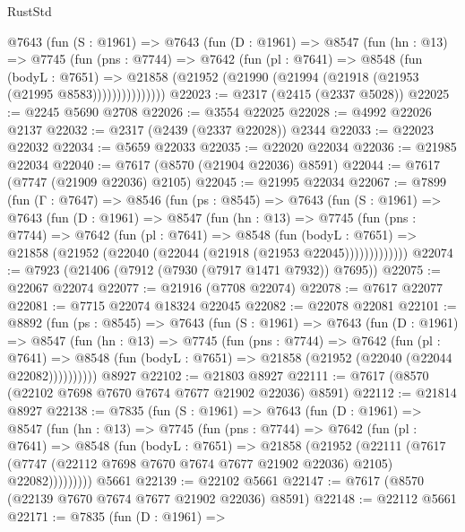 \begin{lexlean}{RustStd}
\begin{coremodule}
        @7643
          (fun (S : @1961) =>
          @7643
            (fun (D : @1961) =>
            @8547
              (fun (hn : @13) =>
              @7745
                (fun (pns : @7744) =>
                @7642
                  (fun (pl : @7641) =>
                  @8548
                    (fun (bodyL : @7651) =>
                    @21858 (@21952 (@21990 (@21994 (@21918 (@21953 (@21995 @8583)))))))))))))))
@22023 := @2317 (@2415 (@2337 @5028))
@22025 := @2245 @5690 @2708
@22026 := @3554 @22025
@22028 := @4992 @22026 @2137
@22032 := @2317 (@2439 (@2337 @22028)) @2344
@22033 := @22023 @22032
@22034 := @5659 @22033
@22035 := @22020 @22034
@22036 := @21985 @22034
@22040 := @7617 (@8570 (@21904 @22036) @8591)
@22044 := @7617 (@7747 (@21909 @22036) @2105)
@22045 := @21995 @22034
@22067 := @7899
    (fun (Γ : @7647) =>
    @8546
      (fun (ps : @8545) =>
      @7643
        (fun (S : @1961) =>
        @7643
          (fun (D : @1961) =>
          @8547
            (fun (hn : @13) =>
            @7745
              (fun (pns : @7744) =>
              @7642
                (fun (pl : @7641) =>
                @8548
                  (fun (bodyL : @7651) =>
                  @21858 (@21952 (@22040 (@22044 (@21918 (@21953 @22045)))))))))))))
@22074 := @7923 (@21406 (@7912 (@7930 (@7917 @1471 @7932)) @7695))
@22075 := @22067 @22074
@22077 := @21916 (@7708 @22074)
@22078 := @7617 @22077
@22081 := @7715 @22074 @18324 @22045
@22082 := @22078 @22081
@22101 := @8892
    (fun (ps : @8545) =>
    @7643
      (fun (S : @1961) =>
      @7643
        (fun (D : @1961) =>
        @8547
          (fun (hn : @13) =>
          @7745
            (fun (pns : @7744) =>
            @7642
              (fun (pl : @7641) =>
              @8548 (fun (bodyL : @7651) => @21858 (@21952 (@22040 (@22044 @22082))))))))))
    @8927
@22102 := @21803 @8927
@22111 := @7617 (@8570 (@22102 @7698 @7670 @7674 @7677 @21902 @22036) @8591)
@22112 := @21814 @8927
@22138 := @7835
    (fun (S : @1961) =>
    @7643
      (fun (D : @1961) =>
      @8547
        (fun (hn : @13) =>
        @7745
          (fun (pns : @7744) =>
          @7642
            (fun (pl : @7641) =>
            @8548
              (fun (bodyL : @7651) =>
              @21858
                (@21952
                  (@22111
                    (@7617
                      (@7747 (@22112 @7698 @7670 @7674 @7677 @21902 @22036) @2105)
                      @22082)))))))))
    @5661
@22139 := @22102 @5661
@22147 := @7617 (@8570 (@22139 @7670 @7674 @7677 @21902 @22036) @8591)
@22148 := @22112 @5661
@22171 := @7835
    (fun (D : @1961) =>

\end{coremodule}
\end{lexlean}

